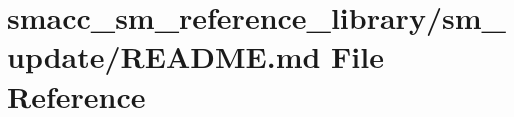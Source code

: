 \hypertarget{smacc__sm__reference__library_2sm__update_2README_8md}{}\section{smacc\+\_\+sm\+\_\+reference\+\_\+library/sm\+\_\+update/\+R\+E\+A\+D\+ME.md File Reference}
\label{smacc__sm__reference__library_2sm__update_2README_8md}
